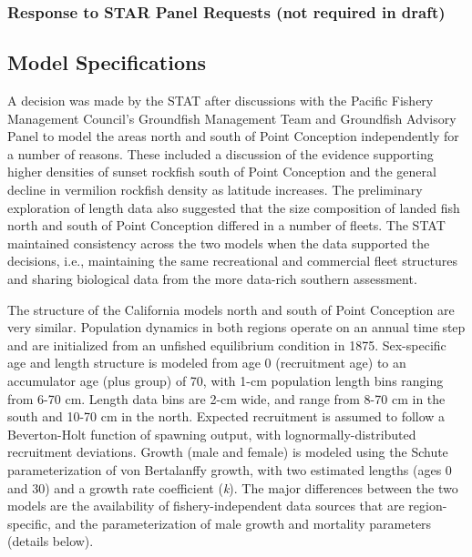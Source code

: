 \documentclass[11pt,
  english,
  a4paper,
]{article}
\begin{document}

\hypertarget{response-to-star-panel-requests-not-required-in-draft}{%
\subsubsection{Response to STAR Panel Requests (not required in draft)}\label{response-to-star-panel-requests-not-required-in-draft}}

\leavevmode\tagmcend\tagstructend


\hypertarget{model-specifications}{%
\subsection{Model Specifications}\label{model-specifications}}

\leavevmode\tagmcend\tagstructend

A decision was made by the STAT after discussions with the Pacific Fishery Management Council's Groundfish Management Team and Groundfish Advisory Panel to model the areas north and south of Point Conception independently for a number of reasons. These included a discussion of the evidence supporting higher densities of sunset rockfish south of Point Conception and the general decline in vermilion rockfish density as latitude increases. The preliminary exploration of length data also suggested that the size composition of landed fish north and south of Point Conception differed in a number of fleets. The STAT maintained consistency across the two models when the data supported the decisions, i.e., maintaining the same recreational and commercial fleet structures and sharing biological data from the more data-rich southern assessment.

The structure of the California models north and south of Point Conception are very similar. Population dynamics in both regions operate on an annual time step and are initialized from an unfished equilibrium condition in 1875. Sex-specific age and length structure is modeled from age 0 (recruitment age) to an accumulator age (plus group) of 70, with 1-cm population length bins ranging from 6-70 cm. Length data bins are 2-cm wide, and range from 8-70 cm in the south and 10-70 cm in the north. Expected recruitment is assumed to follow a Beverton-Holt function of spawning output, with lognormally-distributed recruitment deviations. Growth (male and female) is modeled using the Schute parameterization of von Bertalanffy growth, with two estimated lengths (ages 0 and 30) and a growth rate coefficient (\emph{k}). The major differences between the two models are the availability of fishery-independent data sources that are region-specific, and the parameterization of male growth and mortality parameters (details below).
\end{document}
